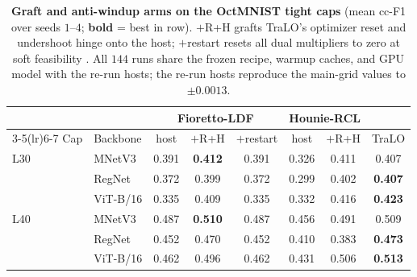 \begin{table}[t]\centering
\caption{\textbf{Graft and anti-windup arms on the OctMNIST tight caps}
(mean cc-F1 over seeds $1$--$4$; \textbf{bold} = best in row). $+$R{+}H grafts
TraLO's optimizer reset and undershoot hinge onto the host; $+$restart resets
all dual multipliers to zero at soft feasibility \citep{gallego2022controlled}.
All $144$ runs share the frozen recipe, warmup caches, and GPU model with the
re-run hosts; the re-run hosts reproduce the main-grid values to $\pm 0.0013$.}
\label{tab:graft}
{\small
\setlength{\tabcolsep}{5pt}
\begin{tabular}{ll cc c cc c}
\toprule
 & & \multicolumn{3}{c}{Fioretto-LDF} & \multicolumn{2}{c}{Hounie-RCL} & \\
\cmidrule(lr){3-5}\cmidrule(lr){6-7}
Cap & Backbone & host & $+$R{+}H & $+$restart & host & $+$R{+}H & TraLO \\
\midrule
L30 & MNetV3 & 0.391 & \textbf{0.412} & 0.391 & 0.326 & 0.411 & 0.407 \\
 & RegNet & 0.372 & 0.399 & 0.372 & 0.299 & 0.402 & \textbf{0.407} \\
 & ViT-B/16 & 0.335 & 0.409 & 0.335 & 0.332 & 0.416 & \textbf{0.423} \\
\midrule
L40 & MNetV3 & 0.487 & \textbf{0.510} & 0.487 & 0.456 & 0.491 & 0.509 \\
 & RegNet & 0.452 & 0.470 & 0.452 & 0.410 & 0.383 & \textbf{0.473} \\
 & ViT-B/16 & 0.462 & 0.496 & 0.462 & 0.431 & 0.506 & \textbf{0.513} \\
\bottomrule
\end{tabular}}
\end{table}
